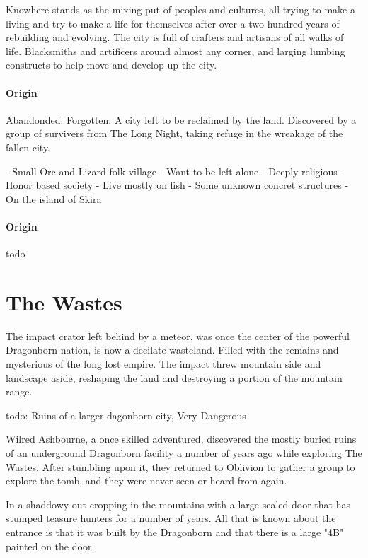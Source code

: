 \documentclass[letterpaper, twocolumn, openany, nodeprecatedcode, layout=true]{dndbook}
\begin{document}
Knowhere stands as the mixing put of peoples and cultures, all trying to make a living and
try to make a life for themselves after over a two hundred years of rebuilding and evolving.
The city is full of crafters and artisans of all walks of life. Blacksmiths and artificers
around almost any corner, and larging lumbing constructs to help move and develop up the
city.

\paragraph{Origin}

Abandonded. Forgotten. A city left to be reclaimed by the land. Discovered by a group of
survivers from The Long Night, taking refuge in the wreakage of the fallen city.

- Small Orc and Lizard folk village
- Want to be left alone
- Deeply religious
- Honor based society
- Live mostly on fish
- Some unknown concret structures
- On the island of Skira

\paragraph{Origin}

todo

\section{The Wastes}

The impact crator left behind by a meteor, was once the center of the powerful Dragonborn
nation, is now a decilate wasteland. Filled with the remains and mysterious of the long
lost empire. The impact threw mountain side and landscape aside, reshaping the land
and destroying a portion of the mountain range.

todo: Ruins of a larger dagonborn city, Very Dangerous


Wilred Ashbourne, a once skilled adventured, discovered the mostly buried ruins of an
underground Dragonborn facility a number of years ago while exploring The Wastes. After
stumbling upon it, they returned to Oblivion to gather a group to explore the tomb,
and they were never seen or heard from again.


In a shaddowy out cropping in the mountains with a large sealed door that has stumped
teasure hunters for a number of years. All that is known about the entrance is that it
was built by the Dragonborn and that there is a large "4B" painted on the door.
\end{document}

